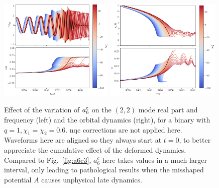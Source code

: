 \documentclass[prd,amssymb,amsmath,amsfonts,nofootinbib,reprint,showpacs,longbibliography]{revtex4-1}
\begin{document}
\begin{figure}
    \includegraphics[width=0.49\textwidth]{figs/delta_a6c_-100.0_30.0.png}
    \includegraphics[width=0.49\textwidth]{figs/delta_a6c_-100.0_30.0_dyn.png}
    \caption{\label{fig:a6c3_nqc}
    Effect of the variation of $a_6^{\rm c}$ on the $(2,2)$ mode real part and frequency (left) and the
    orbital dynamics (right), for a binary with $q = 1, \chi_1 = \chi_2 = 0.6$. \ac{nqc} corrections are not
    applied here.
    Waveforms here are aligned so they always start at $t = 0$, to better appreciate the cumulative effect of the
    deformed dynamics. Compared to Fig.~\ref{fig:a6c3}, $a_6^c$ here takes values in a much larger interval,
    only leading to pathological results when the misshaped potential $A$ causes unphysical late dynamics.}
\end{figure}
\end{document}
